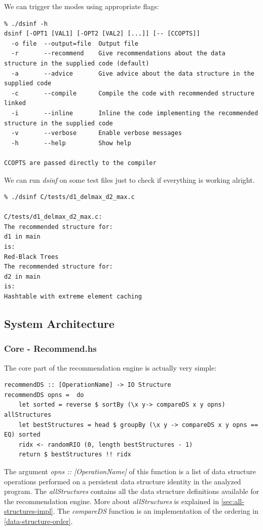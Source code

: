 \documentclass[a4paper,11pt]{article}
\begin{document}
\begin{appendices}
	We can trigger the modes using appropriate flags:
	
	\begingroup
    \fontsize{8pt}{12pt}\selectfont
    \begin{verbatim}  
% ./dsinf -h
dsinf [-OPT1 [VAL1] [-OPT2 [VAL2] [...]] [-- [CCOPTS]]
  -o file  --output=file  Output file
  -r       --recommend    Give recommendations about the data structure in the supplied code (default)
  -a       --advice       Give advice about the data structure in the supplied code
  -c       --compile      Compile the code with recommended structure linked
  -i       --inline       Inline the code implementing the recommended structure in the supplied code
  -v       --verbose      Enable verbose messages
  -h       --help         Show help

CCOPTS are passed directly to the compiler
    \end{verbatim}  
\endgroup
	
	We can run \emph{dsinf} on some test files just to check if everything is working alright.
	\begin{verbatim}
% ./dsinf C/tests/d1_delmax_d2_max.c

C/tests/d1_delmax_d2_max.c:
The recommended structure for:
d1 in main
is:
Red-Black Trees
The recommended structure for:
d2 in main
is:
Hashtable with extreme element caching
	\end{verbatim}
	
	\subsection{System Architecture}
		\subsubsection{Core - Recommend.hs} \label{sec:recommend-impl}
		The core part of the recommendation engine is actually very simple:

\begin{verbatim}
recommendDS :: [OperationName] -> IO Structure
recommendDS opns =  do
    let sorted = reverse $ sortBy (\x y-> compareDS x y opns) allStructures
    let bestStructures = head $ groupBy (\x y -> compareDS x y opns == EQ) sorted
    ridx <- randomRIO (0, length bestStructures - 1)
    return $ bestStructures !! ridx
\end{verbatim}
		The argument \emph{opns :: [OperationName]} of this function is a list of data 
		structure operations performed on a persistent data structure identity in the 
		analyzed program. The \emph{allStructures} contains all the data structure definitions
		available for the recommendation engine. More about \emph{allStructures} is explained
		in \autoref{sec:all-structures-impl}. The \emph{compareDS} function is an implementation
		of the ordering in \autoref{data-structure-order}.
		

\end{appendices}
\end{document}
